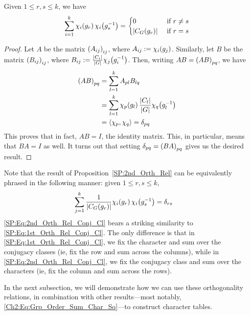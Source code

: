 \begin{boxproposition}\label{SP:2nd_Orth_Rel}
    Given $1 \leq r, s \leq k$, we have
    \begin{align*}
        \sum_{i=1}^{k} \chi_{i}\!\left( g_r \right) \chi_{i}\!\left( g_s^{-1} \right) =
        \begin{cases}
            0 &\text{ if } r \neq s \\
            \left\lvert C_G(g_r) \right\rvert &\text{ if } r = s
        \end{cases}
    \end{align*}
\end{boxproposition}
\begin{proof}
    Let $A$ be the matrix $\left( A_{ij} \right)_{ij}$, where $A_{ij} := \chi_{i}\!\left( g_j \right)$. Similarly, let $B$ be the matrix $\left( B_{ij} \right)_{ij}$, where $B_{ij} := \frac{\left\lvert C_i \right\rvert}{\left\lvert G \right\rvert} \chi_{j}\!\left( g_i^{-1} \right)$. Then, writing $AB = \left( AB \right)_{pq}$, we have
    \begin{align*}
        \left( AB \right)_{pq} &=
        \sum_{l=1}^{k} A_{pl} B_{lq} \\
        &= \sum_{l=1}^{k} \chi_{p}\!\left( g_l \right) \frac{\left\lvert C_l \right\rvert}{\left\lvert G \right\rvert} \chi_{q}\!\left( g_l^{-1} \right) \\
        &= \left\langle \chi_p, \chi_q \right\rangle = \delta_{pq}
    \end{align*}
    This proves that in fact, $AB = I$, the identity matrix. This, in particular, means that $BA = I$ as well. It turns out that setting $\delta_{pq} = \left( BA \right)_{pq}$ gives us the desired result. %
\end{proof}
\begin{remark}
    Note that the result of Proposition~\ref{SP:2nd_Orth_Rel} can be equivalently phrased in the following manner: given $1 \leq r, s \leq k$,
    \begin{align}
        \sum_{j=1}^{k} \frac{1}{\left\lvert C_G(g_r) \right\rvert} \chi_{i}\!\left( g_r \right) \chi_{i}\!\left( g_s^{-1} \right) &= \delta_{rs}
        \label{SP:Eq:2nd_Orth_Rel_Conj_Cl}
    \end{align}
    \eqref{SP:Eq:2nd_Orth_Rel_Conj_Cl} bears a striking similarity to \eqref{SP:Eq:1st_Orth_Rel_Conj_Cl}. The only difference is that in \eqref{SP:Eq:1st_Orth_Rel_Conj_Cl}, we fix the character and sum over the conjugacy classes (ie, fix the row and sum across the columns), while in \eqref{SP:Eq:2nd_Orth_Rel_Conj_Cl}, we fix the conjugacy class and sum over the characters (ie, fix the column and sum across the rows).
\end{remark}

In the next subsection, we will demonstrate how we can use these orthogonality relations, in combination with other results---most notably, \eqref{Ch2:Eq:Grp_Order_Sum_Char_Sq}---to construct character tables.

